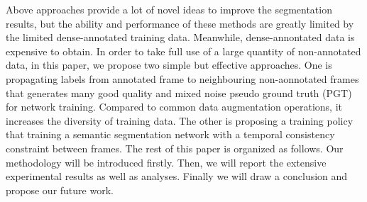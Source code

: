 Above approaches provide a lot of novel ideas to improve the segmentation results, but the ability and performance of these methods are greatly limited by the limited dense-annotated training data.
%
Meanwhile, dense-annontated data is expensive to obtain.
%
In order to take full use of a large quantity of non-annotated data, in this paper, we propose two simple but effective approaches. 
%
One is propagating labels from annotated frame to neighbouring non-aonnotated frames that generates many good quality and mixed noise pseudo ground truth (PGT) for network training. 
%
Compared to common data augmentation operations, it increases the diversity of training data.
%
The other is proposing a training policy that training a semantic segmentation network with a temporal consistency constraint between frames. 
%
The rest of this paper is organized as follows.
% 
Our methodology will be introduced firstly.
%
Then, we will report the extensive experimental results as well as analyses. 
%
Finally we will draw a conclusion and propose our future work.
